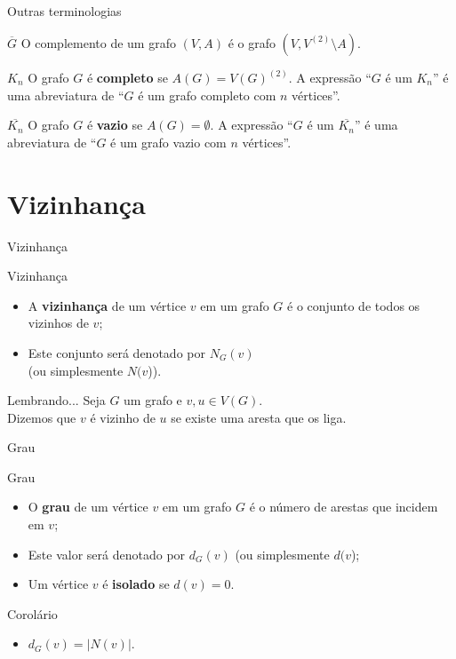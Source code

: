 \documentclass[xcolor=dvipsnames,table]{beamer}
\begin{document}
	\begin{frame}{Outras terminologias}
		\begin{block}{$\overline{G}$}
			O complemento de um grafo $(V, A)$ é o grafo $(V, V^{(2)} \setminus A)$.
		\end{block}
		\pause
		\begin{block}{$K_n$} 
			O grafo $G$ é {\bf completo} se $A(G) = V(G)^{(2)}$. A expressão ``$G$ é um $K_n$'' é uma abreviatura de ``$G$ é um grafo completo com $n$ vértices''.
		\end{block}
		\pause
		\begin{block}{$\overline{K_n}$} 
			O grafo $G$ é {\bf vazio} se $A(G) =\emptyset$. A expressão ``$G$ é um $\overline{K_n}$'' é uma abreviatura de ``$G$ é um grafo vazio com $n$ vértices''.
		\end{block}
	\end{frame}

    \section{Vizinhança}
	\begin{frame}{Vizinhança}
		\begin{block}{Vizinhança}
			\begin{itemize}
				\item A {\bf vizinhança} de um vértice $v$ em um grafo $G$ é o conjunto de todos os vizinhos de $v$; \pause
				\item Este conjunto será denotado por $N_G(v)$ \\(ou simplesmente $N(v$)).
			\end{itemize}
		\end{block} \pause
		\begin{exampleblock}{Lembrando...}
			Seja $G$ um grafo e $v, u \in V(G)$. \\Dizemos que $v$ é vizinho de $u$ se existe uma aresta que os liga.
		\end{exampleblock}
	\end{frame}
	
	\begin{frame}{Grau}
		\begin{block}{Grau}
			\begin{itemize}
				\item O {\bf grau} de um vértice $v$ em um grafo $G$ é o número de arestas que incidem em $v$; \pause
				\item Este valor será denotado por $d_G(v)$ (ou simplesmente $d(v$); \pause
				\item Um vértice $v$ é {\bf isolado} se $d(v) = 0$.
			\end{itemize}
		\end{block} \pause
		\begin{block}{Corolário}
			\begin{itemize}
				\item $d_G(v) = |N(v)|$.
			\end{itemize}
		\end{block}		
	\end{frame}
	
\end{document}
